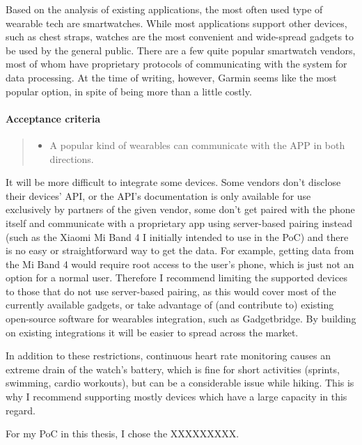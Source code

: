 Based on the analysis of existing applications, the most often used type of wearable tech are smartwatches.
While most applications support other devices, such as chest straps, watches are the most convenient and wide-spread gadgets to be used by the general public.
There are a few quite popular smartwatch vendors, most of whom have proprietary protocols of communicating with the system for data processing.
At the time of writing, however, Garmin seems like the most popular option, in spite of being more than a little costly.


\paragraph*{Acceptance criteria}
\begin{quote}
\begin{itemize}
    \item A popular kind of wearables can communicate with the APP in both directions.
\end{itemize}
\end{quote}

It will be more difficult to integrate some devices.
Some vendors don't disclose their devices' API, or the API's documentation is only available for use exclusively by partners of the given vendor,
some don't get paired with the phone itself and communicate with a proprietary app using server-based pairing instead (such as the Xiaomi Mi Band 4 I initially intended to use in the PoC) and there is no easy or straightforward way to get the data.
For example, getting data from the Mi Band 4 would require root access to the user's phone\cite{miband4-server-based}, which is just not an option for a normal user.
Therefore I recommend limiting the supported devices to those that do not use server-based pairing, as this would cover most of the currently available gadgets,
or take advantage of (and contribute to) existing open-source software for wearables integration, such as Gadgetbridge\cite{Gadgetbridge}.
By building on existing integrations it will be easier to spread across the market.

In addition to these restrictions, continuous heart rate monitoring causes an extreme drain of the watch's battery, which is fine for short activities (sprints, swimming, cardio workouts), but can be a considerable issue while hiking.
This is why I recommend supporting mostly devices which have a large capacity in this regard.

For my PoC in this thesis, I chose the XXXXXXXXX.

